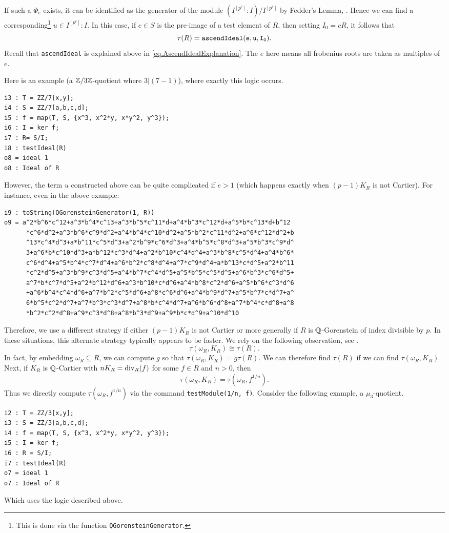 \documentclass[11pt]{amsart}
\begin{document}
If such a $\Phi_e$ exists, it can be identified as the generator of the module $(I^{[p^e]} : I) / I^{[p^e]}$ by Fedder's Lemma, \cite{FedderFPureRat}.  Hence we can find a corresponding\footnote{This is done via the function {\tt QGorensteinGenerator}. } $u \in I^{[p^e]} : I$.  In this case, if $c \in S$ is the pre-image of a test element of $R$, then setting $I_0 = cR$, it follows that
\[
\tau(R) = {\tt ascendIdeal(e, u, I_0)}.
\]
Recall that {\tt ascendIdeal} is explained above in \autoref{eq.AscendIdealExplanation}.  The $e$ here means all frobenius roots are taken as multiples of $e$.  

Here is an example (a $\mathbb{Z}/3\mathbb{Z}$-quotient where $3 | (7-1)$), where exactly this logic occurs.
\begin{verbatim}
i3 : T = ZZ/7[x,y];
i4 : S = ZZ/7[a,b,c,d];
i5 : f = map(T, S, {x^3, x^2*y, x*y^2, y^3});
i6 : I = ker f;
i7 : R= S/I;
i8 : testIdeal(R)
o8 = ideal 1
o8 : Ideal of R
\end{verbatim}
However, the term $u$ constructed above can be quite complicated if $e > 1$ (which happens exactly when $(p -1)K_R$ is not Cartier).  For instance, even in the above example:
\begin{verbatim}
i9 : toString(QGorensteinGenerator(1, R))
o9 = a^2*b^6*c^12+a^3*b^4*c^13+a^3*b^5*c^11*d+a^4*b^3*c^12*d+a^5*b*c^13*d+b^12
      *c^6*d^2+a^3*b^6*c^9*d^2+a^4*b^4*c^10*d^2+a^5*b^2*c^11*d^2+a^6*c^12*d^2+b
      ^13*c^4*d^3+a*b^11*c^5*d^3+a^2*b^9*c^6*d^3+a^4*b^5*c^8*d^3+a^5*b^3*c^9*d^
      3+a^6*b*c^10*d^3+a*b^12*c^3*d^4+a^2*b^10*c^4*d^4+a^3*b^8*c^5*d^4+a^4*b^6*
      c^6*d^4+a^5*b^4*c^7*d^4+a^6*b^2*c^8*d^4+a^7*c^9*d^4+a*b^13*c*d^5+a^2*b^11
      *c^2*d^5+a^3*b^9*c^3*d^5+a^4*b^7*c^4*d^5+a^5*b^5*c^5*d^5+a^6*b^3*c^6*d^5+
      a^7*b*c^7*d^5+a^2*b^12*d^6+a^3*b^10*c*d^6+a^4*b^8*c^2*d^6+a^5*b^6*c^3*d^6
      +a^6*b^4*c^4*d^6+a^7*b^2*c^5*d^6+a^8*c^6*d^6+a^4*b^9*d^7+a^5*b^7*c*d^7+a^
      6*b^5*c^2*d^7+a^7*b^3*c^3*d^7+a^8*b*c^4*d^7+a^6*b^6*d^8+a^7*b^4*c*d^8+a^8
      *b^2*c^2*d^8+a^9*c^3*d^8+a^8*b^3*d^9+a^9*b*c*d^9+a^10*d^10
\end{verbatim}
Therefore, we use a different strategy if either $(p-1)K_R$ is not Cartier or more generally if $R$ is $\mathbb{Q}$-Gorenstein of index divisible by $p$.   In these situations, this alternate strategy typically appears to be faster.  We rely on the following observation, see \cite{BlickleSchwedeTuckerTestAlterations}.
\[
\tau(\omega_R, K_R) \cong \tau(R).
\]
In fact, by embedding $\omega_R \subseteq R$, we can compute $g$ so that $\tau(\omega_R, K_R) = g \tau(R)$.  We can therefore find $\tau(R)$ if we can find $\tau(\omega_R, K_R)$.
Next, if $K_R$ is $\mathbb{Q}$-Cartier with $nK_R = \operatorname{{div}}_R(f)$ for some $f \in R$ and $n > 0$, then
\[
\tau(\omega_R, K_R) =\tau(\omega_R, f^{1/n}).
\]
Thus we directly compute $\tau(\omega_R, f^{1/n})$ via the command {\tt testModule(1/n, f)}.  Consider the following example, a $\mu_3$-quotient.
\begin{verbatim}
i2 : T = ZZ/3[x,y];
i3 : S = ZZ/3[a,b,c,d];
i4 : f = map(T, S, {x^3, x^2*y, x*y^2, y^3});
i5 : I = ker f;
i6 : R = S/I;
i7 : testIdeal(R)
o7 = ideal 1
o7 : Ideal of R
\end{verbatim}
Which uses the logic described above.
\end{document}
